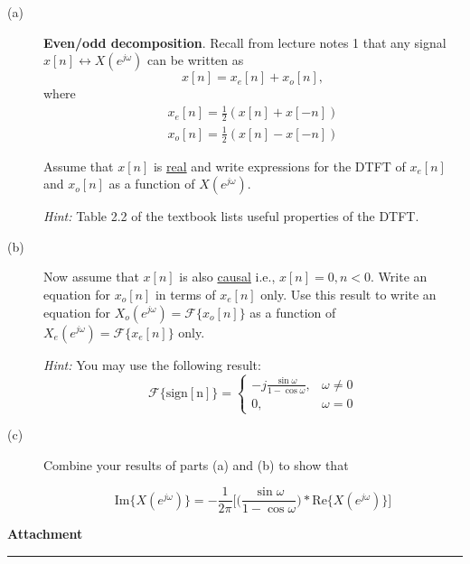 \documentclass[12pt]{report}
\begin{document}
\begin{description}
	\item[(a)] \textbf{Even/odd decomposition}. Recall from lecture notes 1 that any signal $x[n] \leftrightarrow X(e^{j\omega})$ can be written as
	\begin{equation}
	x[n] = x_e[n] + x_o[n],
	\end{equation}
	where 
	\begin{align}
	x_e[n] = \frac{1}{2}(x[n] + x[-n]) \tag{even symmetric: $x_e[n] = x_e[-n]$} \\
	x_o[n] = \frac{1}{2}(x[n] - x[-n]) \tag{odd symmetric: $x_o[n] = -x_o[-n]$}
	\end{align}
	
	Assume that $x[n]$ is \underline{real} and write expressions for the DTFT of $x_e[n]$ and $x_o[n]$ as a function of $X(e^{j\omega})$.
	
	\textit{Hint:} Table 2.2 of the textbook lists useful properties of the DTFT.
	
	\item[(b)] Now assume that $x[n]$ is also \underline{causal} i.e., $x[n] = 0, n < 0$. Write an equation for $x_o[n]$ in terms of $x_e[n]$ only. Use this result to write an equation for $X_o(e^{j\omega}) = \mathcal{F}\{x_o[n]\}$ as a function of $X_e(e^{j\omega})=\mathcal{F}\{x_e[n]\}$ only.
	
	\textit{Hint:} You may use the following result:
	\begin{equation}
	\mathcal{F}\{\mathrm{sign[n]}\} = \begin{cases}
	-j\displaystyle\frac{\sin\omega}{1-\cos\omega}, &\omega\neq 0 \\
	0, &\omega = 0
	\end{cases}
	\end{equation} 
	
	\item[(c)] Combine your results of parts (a) and (b) to show that 
	
	\begin{equation}
	\mathrm{Im}\{X(e^{j\omega})\} = -\frac{1}{2\pi}\bigg[\Big(\frac{\sin\omega}{1-\cos\omega}\Big)\ast \mathrm{Re}\{X(e^{j\omega})\}\bigg]
	\end{equation}
\end{description} 

\newpage
\noindent \textbf{Attachment}\\
\rule{6.5 in}{0.5pt}
\end{document}
